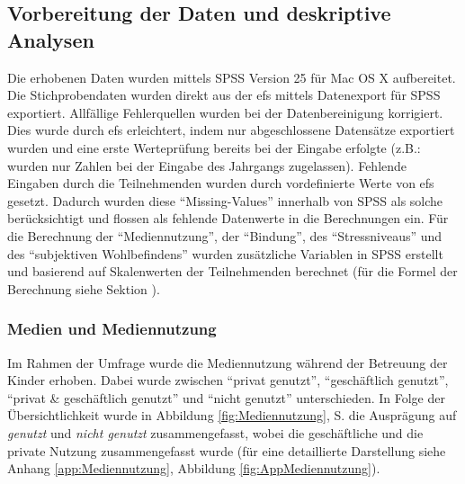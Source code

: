 \subsection{Vorbereitung der Daten und deskriptive Analysen}
Die erhobenen Daten wurden mittels SPSS Version 25 für Mac OS X aufbereitet. Die Stichprobendaten wurden direkt aus der \acrfull{efs} \cite{Questback2018} mittels Datenexport für SPSS exportiert. Allfällige Fehlerquellen wurden bei der Datenbereinigung korrigiert. Dies wurde durch \acrshort{efs} erleichtert, indem nur abgeschlossene Datensätze exportiert wurden und eine erste Werteprüfung bereits bei der Eingabe erfolgte (z.B.: wurden nur Zahlen bei der Eingabe des Jahrgangs zugelassen). Fehlende Eingaben durch die Teilnehmenden wurden durch vordefinierte Werte von \acrshort{efs} gesetzt. Dadurch wurden diese \enquote{Missing-Values} innerhalb von SPSS als solche berücksichtigt und flossen als fehlende Datenwerte in die Berechnungen ein. Für die Berechnung der \enquote{Mediennutzung}, der \enquote{Bindung}, des \enquote{Stressniveaus} und des \enquote{subjektiven Wohlbefindens} wurden zusätzliche Variablen in SPSS erstellt und basierend auf Skalenwerten der Teilnehmenden berechnet (für die Formel der Berechnung siehe Sektion \textit{}).

\subsubsection{Medien und Mediennutzung}
Im Rahmen der Umfrage wurde die Mediennutzung während der Betreuung der Kinder erhoben. Dabei wurde zwischen \enquote{privat genutzt}, \enquote{geschäftlich genutzt}, \enquote{privat \& geschäftlich genutzt} und \enquote{nicht genutzt} unterschieden. In Folge der Übersichtlichkeit wurde in Abbildung \ref{fig:Mediennutzung}, S. \pageref{fig:Mediennutzung} die Ausprägung auf \textit{genutzt} und \textit{nicht genutzt} zusammengefasst, wobei die geschäftliche und die private Nutzung zusammengefasst wurde (für eine detaillierte Darstellung siehe Anhang \ref{app:Mediennutzung}, Abbildung \ref{fig:AppMediennutzung}).

